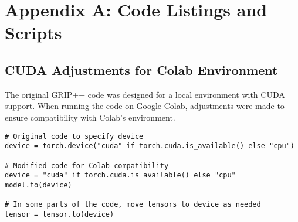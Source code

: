 

\chapter{Appendix A: Code Listings and Scripts} %

\label{AppendixA} %



\section{CUDA Adjustments for Colab Environment}

\tab The original GRIP++ code was designed for a local environment with CUDA support. When running the code on Google Colab, adjustments were made to ensure compatibility with Colab’s environment.

\begin{verbatim}
# Original code to specify device
device = torch.device("cuda" if torch.cuda.is_available() else "cpu")

# Modified code for Colab compatibility
device = "cuda" if torch.cuda.is_available() else "cpu"
model.to(device)

# In some parts of the code, move tensors to device as needed
tensor = tensor.to(device)
\end{verbatim}

